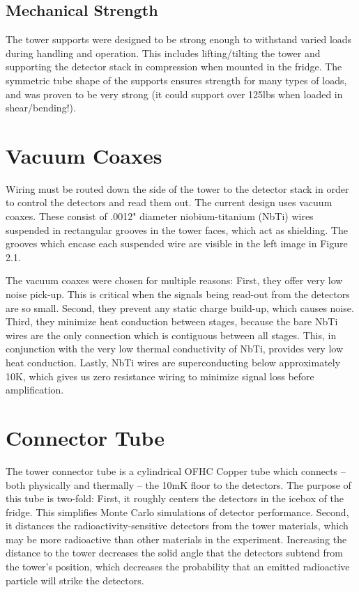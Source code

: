 \documentclass{report}
\begin{document}
\subsection{Mechanical Strength}
The tower supports were designed to be strong enough to withstand varied loads during handling and operation. This includes lifting/tilting the tower and supporting the detector stack in compression when mounted in the fridge. The symmetric tube shape of the supports ensures strength for many types of loads, and was proven to be very strong (it could support over 125lbs when loaded in shear/bending!).


\section{Vacuum Coaxes}
Wiring must be routed down the side of the tower to the detector stack in order to control the detectors and read them out. The current design uses vacuum coaxes. These consist of .0012" diameter niobium-titanium (NbTi) wires suspended in rectangular grooves in the tower faces, which act as shielding. The grooves which encase each suspended wire are visible in the left image in Figure 2.1.

The vacuum coaxes were chosen for multiple reasons: First, they offer very low noise pick-up. This is critical when the signals being read-out from the detectors are so small. Second, they prevent any static charge build-up, which causes noise. Third, they minimize heat conduction between stages, because the bare NbTi wires are the only connection which is contiguous between all stages. This, in conjunction with the very low thermal conductivity of NbTi, provides very low heat conduction. Lastly, NbTi wires are superconducting below approximately 10K, which gives us zero resistance wiring to minimize signal loss before amplification.

\section{Connector Tube}
The tower connector tube is a cylindrical OFHC Copper tube which connects -- both physically and thermally -- the 10mK floor to the detectors. The purpose of this tube is two-fold: First, it roughly centers the detectors in the icebox of the fridge. This simplifies Monte Carlo simulations of detector performance. Second, it distances the radioactivity-sensitive detectors from the tower materials, which may be more radioactive than other materials in the experiment. Increasing the distance to the tower decreases the solid angle that the detectors subtend from the tower's position, which decreases the probability that an emitted radioactive particle will strike the detectors.
\end{document}
